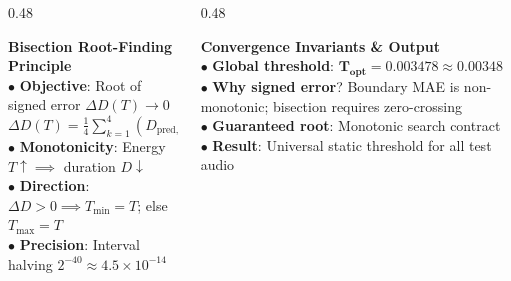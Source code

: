 \documentclass[aspectratio=169, 10pt]{beamer}
\begin{document}
\begin{frame}
\begin{tcolorbox}[contentframe]
\begin{center}
  \end{center}

  \vspace{4pt}
  \begin{columns}[T]
    \begin{column}{0.48\textwidth}
      \begin{tcolorbox}[darkcard, height=3.45cm, valign=top, top=4pt, bottom=4pt]
        {\fontsize{8.5pt}{9.5pt}\selectfont\color{cyanGlow}\textbf{Bisection Root-Finding Principle}}\\[2pt]
        {\fontsize{7.5pt}{8.5pt}\selectfont
        $\bullet$ \textbf{Objective}: Root of signed error $\Delta D(T) \to 0$\\[1.5pt]
        \quad $\Delta D(T) = \frac{1}{4}\sum_{k=1}^4 (D_{\text{pred}, k}(T) - D_{\text{gt}, k})$\\[1.5pt]
        $\bullet$ \textbf{Monotonicity}: Energy $T \uparrow \implies$ duration $D \downarrow$\\[1.5pt]
        $\bullet$ \textbf{Direction}: $\Delta D > 0 \implies T_{\min} = T$; else $T_{\max} = T$\\[1.5pt]
        $\bullet$ \textbf{Precision}: Interval halving $2^{-40} \approx 4.5 \times 10^{-14}$}
      \end{tcolorbox}
    \end{column}

    \begin{column}{0.48\textwidth}
      \begin{tcolorbox}[mintcard, height=3.45cm, valign=top, top=4pt, bottom=4pt]
        {\fontsize{8.5pt}{9.5pt}\selectfont\color{mintGreen}\textbf{Convergence Invariants \& Output}}\\[2pt]
        {\fontsize{7.5pt}{8.5pt}\selectfont
        $\bullet$ \textbf{Global threshold}: $\mathbf{T_{\text{opt}} = 0.003478 \approx 0.00348}$\\[1.5pt]
        $\bullet$ \textbf{Why signed error}? Boundary MAE is non-monotonic; bisection requires zero-crossing\\[1.5pt]
        $\bullet$ \textbf{Guaranteed root}: Monotonic search contract\\[1.5pt]
        $\bullet$ \textbf{Result}: Universal static threshold for all test audio}
      \end{tcolorbox}
    \end{column}
  \end{columns}
  \end{tcolorbox}
\end{frame}
\end{document}
